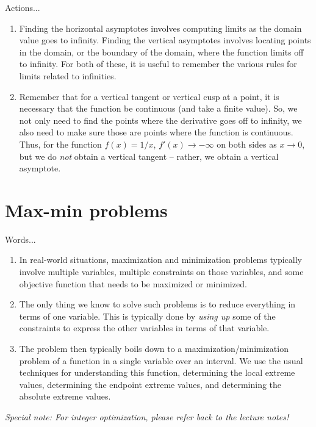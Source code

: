 \documentclass[10pt]{amsart}
\begin{document}
Actions...

\begin{enumerate}
\item Finding the horizontal asymptotes involves computing limits as
  the domain value goes to infinity. Finding the vertical asymptotes
  involves locating points in the domain, or the boundary of the
  domain, where the function limits off to infinity. For both of
  these, it is useful to remember the various rules for limits related
  to infinities.
\item Remember that for a vertical tangent or vertical cusp at a
  point, it is necessary that the function be continuous (and take a
  finite value). So, we not only need to find the points where the
  derivative goes off to infinity, we also need to make sure those are
  points where the function is continuous. Thus, for the function
  $f(x) = 1/x$, $f'(x) \to - \infty$ on both sides as $x \to 0$, but
  we do {\em not} obtain a vertical tangent -- rather, we obtain a
  vertical asymptote.
\end{enumerate}

\section{Max-min problems}

Words...

\begin{enumerate}
\item In real-world situations, maximization and minimization problems
  typically involve multiple variables, multiple constraints on those
  variables, and some objective function that needs to be maximized or
  minimized.
\item The only thing we know to solve such problems is to reduce
  everything in terms of one variable. This is typically done by {\em
  using up} some of the constraints to express the other variables in
  terms of that variable.
\item The problem then typically boils down to a
  maximization/minimization problem of a function in a single variable
  over an interval. We use the usual techniques for understanding this
  function, determining the local extreme values, determining the
  endpoint extreme values, and determining the absolute extreme
  values.
\end{enumerate}

{\em Special note: For integer optimization, please refer back to the
lecture notes!}
\end{document}
